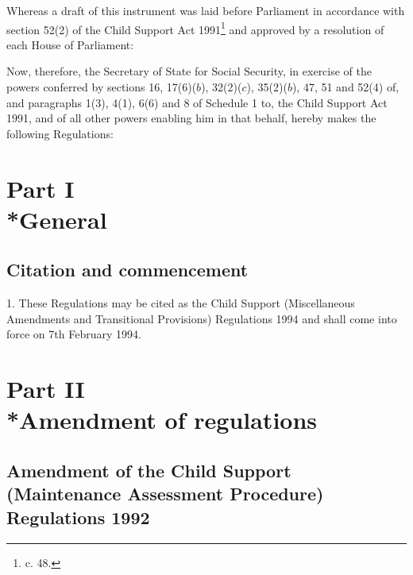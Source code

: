 \documentclass[12pt,a4paper]{article}
\title{\regstitle}
\author{S.I. 1994 No. 227}
\date{Made 3rd February 1994\\Coming into force 7th February 1994}
\begin{document}
\maketitle

\noindent
Whereas a draft of this instrument was laid before Parliament in accordance with section 52(2) of the Child Support Act 1991\footnote{ c. 48.} and approved by a resolution of each House of Parliament:

Now, therefore, the Secretary of State for Social Security, in exercise of the powers conferred by sections 16, 17(6)($b$), 32(2)($c$), 35(2)($b$), 47, 51 and 52(4) of, and paragraphs 1(3), 4(1), 6(6) and 8 of Schedule 1 to, the Child Support Act 1991, and of all other powers enabling him in that behalf, hereby makes the following Regulations:

{\sloppy

\tableofcontents

}

\setcounter{secnumdepth}{-2}

\section[Part I --- General]{Part I\\*General}

\renewcommand\parthead{--- Part I}

\subsection[1. Citation and commencement]{Citation and commencement}

1.  These Regulations may be cited as the Child Support (Miscellaneous Amendments and Transitional Provisions) Regulations 1994 and shall come into force on 7th February 1994.

\section[Part II --- Amendment of regulations]{Part II\\*Amendment of regulations}

\renewcommand\parthead{--- Part II}

\subsection[2. Amendment of the Child Support (Maintenance Assessment Procedure) Regulations 1992]{\sloppy Amendment of the Child Support (Maintenance Assessment Procedure) Regulations 1992}
\end{document}

